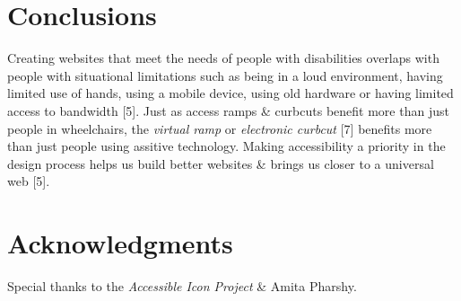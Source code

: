 \documentclass{acm_proc_article-sp}
\begin{document}
\section{Conclusions}
Creating websites that meet the needs of people with disabilities overlaps with people with situational limitations such as being in a loud environment, having limited use of hands, using a mobile device, using old hardware or having limited access to bandwidth [5]. Just as access ramps \& curbcuts benefit more than just people in wheelchairs, the \textit{virtual ramp} or \textit{electronic curbcut} [7] benefits more than just people using assitive technology. Making accessibility a priority in the design process helps us build better websites \& brings us closer to a universal web [5].

\section{Acknowledgments}
Special thanks to the {\it Accessible Icon Project} \& Amita Pharshy.

\end{document}
